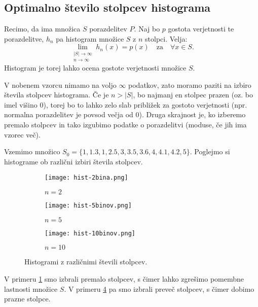 \subsection{Optimalno število stolpcev histograma}

Recimo, da ima množica $S$ porazdelitev $P$. Naj bo $p$ gostota verjetnosti te porazdelitve, $h_n$ pa histogram množice $S$ z $n$ stolpci. Velja:
\begin{equation}
    \lim_{\begin{smallmatrix} |S| \to \infty \\ n \to \infty \end{smallmatrix}} h_n(x) = p(x) \quad \text{za} \quad \forall x \in S.
\end{equation}
Histogram je torej lahko ocena gostote verjetnosti množice $S$.

V nobenem vzorcu nimamo na voljo $\infty$ podatkov, zato moramo paziti na izbiro števila stolpcev histograma. Če je $n>|S|$, bo najmanj en stolpec prazen (oz. bo imel višino 0), torej bo to lahko zelo slab približek za gostoto verjetnosti (npr. normalna porazdelitev je povsod večja od 0). Druga skrajnost je, ko izberemo premalo stolpcev in tako izgubimo podatke o porazdelitvi (moduse, če jih ima vzorec več).


\begin{zgled}
Vzemimo množico $S_0 = \{1,1.3,1,2.5,3,3.5,3.6,4,4.1,4.2,5\}$. Poglejmo si histograme ob različni izbiri števila stolpcev.
\begin{figure}[!h]
    \centering
    \begin{subfigure}{0.3\textwidth}
        \centering
        \texttt{[image: hist-2bina.png]}
        \caption{$n=2$}
        \label{2-bina}
    \end{subfigure}
    \begin{subfigure}{0.3\textwidth}
        \centering
        \texttt{[image: hist-5binov.png]}
        \caption{$n=5$}
        \label{5-binov}
    \end{subfigure}
    \begin{subfigure}{0.3\textwidth}
        \centering
        \texttt{[image: hist-10binov.png]}
        \caption{$n=10$}
        \label{10-binov}
    \end{subfigure}
    \caption{Histogrami z različnimi števili stolpcev.}
\end{figure}

V primeru \ref{2-bina} smo izbrali premalo stolpcev, s čimer lahko zgrešimo pomembne lastnosti množice $S$. V primeru \ref{10-binov} pa smo izbrali preveč stolpcev, s čimer dobimo prazne stolpce.
\end{zgled}

